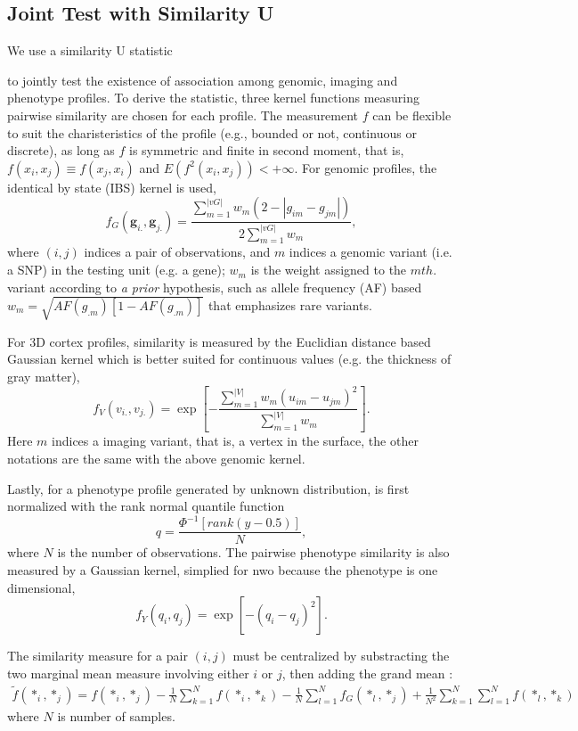 \subsection{Joint Test with Similarity U}
We use a similarity U statistic {\cite{UST1, UST2} to jointly test the existence of association among genomic, imaging and phenotype profiles. To derive the statistic, three kernel functions measuring pairwise similarity are chosen for each profile. The measurement $f$ can be flexible to suit the charisteristics of the profile (e.g., bounded or not, continuous or discrete), as long as $f$ is symmetric and finite in second moment, that is, $f(x_i,x_j) \equiv f(x_j,x_i)$ and $E(f^2(x_i, x_j))<+\infty$.
\newcommand{\vg}{\boldsymbol{g}}
\newcommand{\vv}{\boldsymbol{v}}
\newcommand{\vy}{\boldsymbol{y}}
\newcommand{\vG}{\boldsymbol{G}}
\newcommand{\vV}{\boldsymbol{V}}
\newcommand{\vY}{\boldsymbol{Y}}
\newcommand{\vq}{\boldsymbol{q}}
For genomic profiles, the identical by state (IBS) kernel is used,
\label{eq:wSG}
\[ f_G(\vg_{i.}, \vg_{j.}) = \frac{\sum_{m=1}^{|vG|}{w_m(2 - |g_{im} - g_{jm}|)}} {2\sum_{m=1}^{|vG|}{w_m}}, \]
where $(i,j)$ indices a pair of observations, and $m$ indices a genomic variant (i.e. a SNP) in the testing unit (e.g. a gene); $w_m$ is the weight assigned to the $m th.$ variant according to \textit{a prior} hypothesis, such as allele frequency (AF) based $w_m=\sqrt{AF(g_{.m})[1-AF(g_{.m})]}$ that emphasizes rare variants.

For 3D cortex profiles, similarity is measured by the Euclidian distance based Gaussian kernel which is better suited for continuous values (e.g. the thickness of gray matter),
\label{eq:wSV}
\[ f_V(v_{i.},v_{j.}) = \exp{ [-\frac{\sum_{m=1}^{|V|}{w_m(u_{im}-u_{jm})^2}} {\sum_{m=1}^{|V|}{w_m}}] }. \]
Here $m$ indices a imaging variant, that is, a vertex in the surface, the other notations are the same with the above genomic kernel.

Lastly, for a phenotype profile generated by unknown distribution, is first normalized with the rank normal quantile function
\[ q = \frac{\Phi^{-1}[rank(y - 0.5)]}{N}, \]
where $N$ is the number of observations. The pairwise phenotype similarity is also measured by a Gaussian kernel, simplied for nwo because the phenotype is one dimensional,
\[ f_Y(q_i, q_j) = \exp{[-(q_i - q_j)^2]}. \]

The similarity measure for a pair $(i, j)$ must be centralized by substracting the two marginal mean measure involving either $i$ or $j$, then adding the grand mean \cite{UST1}:
\begin{align*}
  \tilde{f}(*_i, *_j) = f(*_i, *_j)-\frac{1}{N} \sum_{k=1}^N{f(*_i, *_k)}-\frac{1}{N}\sum_{l=1}^N{f_G(*_l, *_j)} + \frac{1}{N^2} \sum_{k=1}^{N} \sum_{l=1}^{N} {f(*_l, *_k)}
\end{align*}
where $N$ is number of samples. 

}
